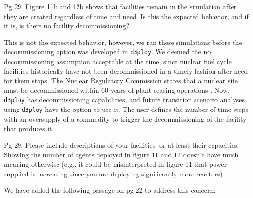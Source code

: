 \documentclass[answers,11pt]{exam}
\newcommand{\deploy}{\texttt{d3ploy}\xspace}%
\begin{document}
\begin{questions}
\question 
Pg 29. Figure 11b and 12b shows that facilities remain in the simulation after 
they are created regardless of time and need. Is this the expected behavior, 
and if it is, is there no facility decommissioning?

\begin{solution}
This is not the expected behavior, however, we ran these simulations before the 
decommissioning option was developed in \deploy. We deemed the no decommissioning assumption 
acceptable at the time, since nuclear fuel cycle facilities historically have not been 
decommissioned in a timely fashion after need for them stops. 
The Nuclear Regulatory Commission states that a nuclear site must be decommissioned 
within 60 years of plant ceasing operations \cite{noauthor_portsmouth_nodate}. 
Now, \deploy \cite{chee_arfc/d3ploy:_2019} 
has decommissioning capabilities, 
and future transition scenario analyses using \deploy have the option to use it.  
The user defines the number of time steps with an oversupply of a commodity 
to trigger the decommissioning of the facility that produces it. 
\end{solution}

\question
Pg 29. Please include descriptions of your facilities, or at least their capacities. 
Showing the number of agents deployed in figure 11 and 12 doesn't have much meaning 
otherwise (e.g., it could be misinterpreted in figure 11 that power supplied is 
increasing since you are deploying significantly more reactors).

\begin{solution}
We have added the following passage on pg 22 to address this concern: 


\end{solution}
\end{questions}
\end{document}
